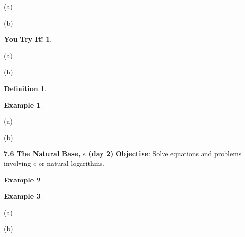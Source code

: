 \documentclass{report}
\theoremstyle{definition}
\newtheorem{example}{\bf Example}
\newtheorem{youtry}{\bf You Try It!}
\newtheorem{definition}{\bf Definition}[section]
\begin{document}
 \begin{minipage}[t]{0.45\linewidth}
 (a) 
 \end{minipage}
 \hfill
 \begin{minipage}[t]{0.45\linewidth}
 (b) 
 \end{minipage}
\vfill

 \begin{youtry}

 \end{youtry}
 
 \begin{minipage}[t]{0.45\linewidth}
 (a) 
 \end{minipage}
 \hfill
 \begin{minipage}[t]{0.45\linewidth}
 (b) 
 \end{minipage}
\vfill

\begin{definition}
\end{definition}

\begin{example}

\end{example}

\begin{minipage}[t]{0.45\linewidth}
(a) 
\end{minipage}
\hfill
\begin{minipage}[t]{0.45\linewidth}
(b) 
\end{minipage}


\vfill
\noindent{}
 \newpage

\noindent \Large \textbf{7.6 The Natural Base, $e$ (day 2)} \normalsize
 \indent\hfill\small\noindent \textbf{Objective}: Solve equations and problems involving $e$ or natural logarithms.\normalsize\\

\begin{example}

\end{example}
\vfill

\begin{example}

\end{example}
(a) 
\vfill

(b) 


\vfill
\noindent{}
 \newpage
\end{document}
